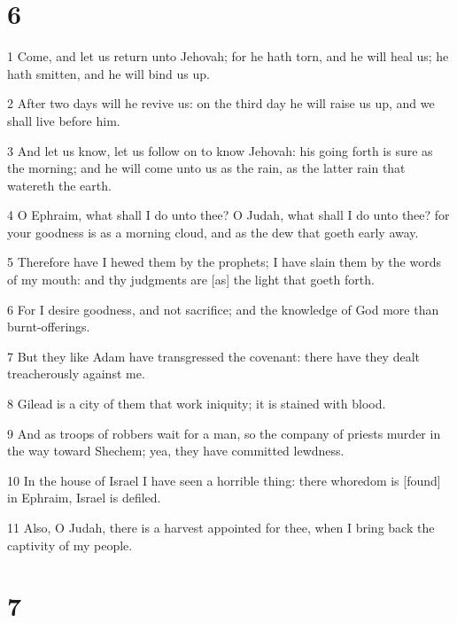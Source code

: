 \chapter{6}

\par 1 Come, and let us return unto Jehovah; for he hath torn, and he will heal us; he hath smitten, and he will bind us up.
\par 2 After two days will he revive us: on the third day he will raise us up, and we shall live before him.
\par 3 And let us know, let us follow on to know Jehovah: his going forth is sure as the morning; and he will come unto us as the rain, as the latter rain that watereth the earth.
\par 4 O Ephraim, what shall I do unto thee? O Judah, what shall I do unto thee? for your goodness is as a morning cloud, and as the dew that goeth early away.
\par 5 Therefore have I hewed them by the prophets; I have slain them by the words of my mouth: and thy judgments are [as] the light that goeth forth.
\par 6 For I desire goodness, and not sacrifice; and the knowledge of God more than burnt-offerings.
\par 7 But they like Adam have transgressed the covenant: there have they dealt treacherously against me.
\par 8 Gilead is a city of them that work iniquity; it is stained with blood.
\par 9 And as troops of robbers wait for a man, so the company of priests murder in the way toward Shechem; yea, they have committed lewdness.
\par 10 In the house of Israel I have seen a horrible thing: there whoredom is [found] in Ephraim, Israel is defiled.
\par 11 Also, O Judah, there is a harvest appointed for thee, when I bring back the captivity of my people.

\chapter{7}

